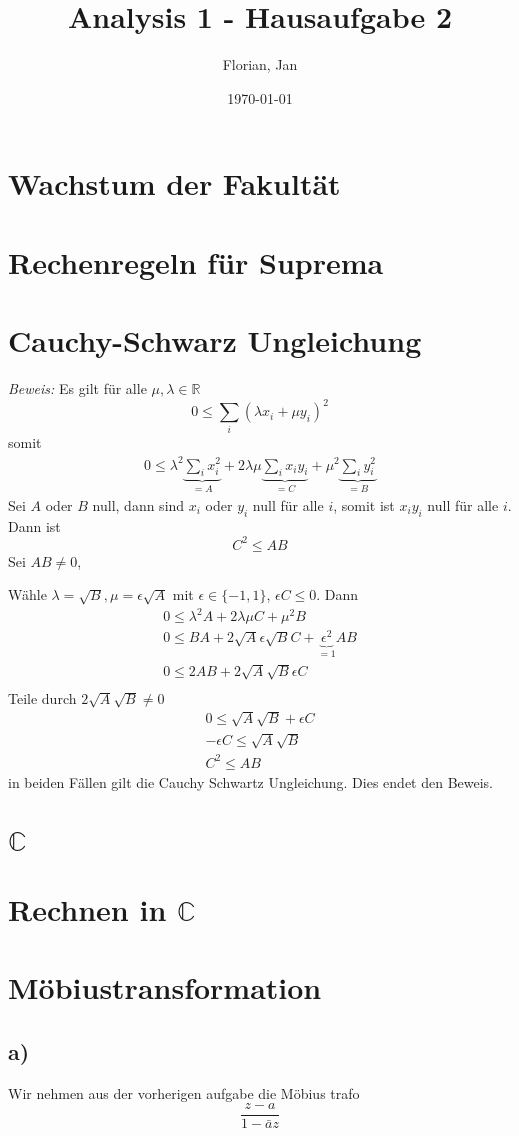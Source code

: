 \documentclass[]{scrartcl}
\title{Analysis 1 - Hausaufgabe 2}
\author{Florian, Jan}
\date{\today}
\begin{document}
\maketitle
\newpage
\tableofcontents
\newpage

\section{Wachstum der Fakultät}

\section{Rechenregeln für Suprema}

\section{Cauchy-Schwarz Ungleichung}

\textit{Beweis:} Es gilt für alle $\mu,\lambda\in \mathbb{R}$
\begin{equation}
	0 \leq \sum_i (\lambda x_i + \mu y_i)^2
\end{equation}
somit
\begin{gather}
	0 \leq \lambda^2 \underbrace{\sum_i x_i^2}_{=A} + 2\lambda\mu\underbrace{\sum_i x_iy_i}_{=C} + \mu^2 \underbrace{\sum_i y_i^2}_{=B}
\end{gather}
Sei $A$ oder $B$ null, dann sind $x_i$ oder $y_i$ null für alle $i$, somit ist $x_iy_i$ null für alle $i$. Dann ist
\begin{equation}
	C^2 \leq AB
\end{equation}
Sei $AB\neq0$,

Wähle $\lambda = \sqrt B, \mu = \epsilon\sqrt A$ mit $\epsilon\in\{-1,1\}$, $\epsilon C \leq 0$. Dann
\begin{gather}
	0 \leq \lambda^2 A + 2\lambda\mu C + \mu^2 B\\
	0 \leq BA + 2\sqrt A \epsilon\sqrt B C + \underbrace{\epsilon^2}_{=1} AB\\
	0 \leq 2AB + 2\sqrt A\sqrt B \epsilon C\\
\end{gather}
Teile durch $2\sqrt A\sqrt B \neq0$
\begin{gather}
	0 \leq \sqrt A\sqrt B + \epsilon C\\
	-\epsilon C \leq \sqrt A\sqrt B\\
	C^2 \leq AB
\end{gather}
in beiden Fällen gilt die Cauchy Schwartz Ungleichung. Dies endet den Beweis.


\section{$\mathbb{C}$}

\section{Rechnen in $\mathbb{C}$}

\section{Möbiustransformation}
\subsection{a)}
Wir nehmen aus der vorherigen aufgabe die Möbius trafo
\begin{equation}
	\frac{z-a}{1-\bar a z}
\end{equation}
\end{document}
